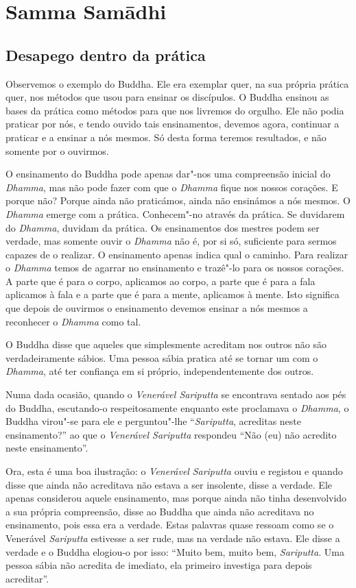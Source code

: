 \chapter{Samma Samādhi}

\section{Desapego dentro da prática}

Observemos o exemplo do Buddha. Ele era exemplar quer, na sua própria
prática quer, nos métodos que usou para ensinar os discípulos. O Buddha
ensinou as bases da prática como métodos para que nos livremos do
orgulho. Ele não podia praticar por nós, e tendo ouvido tais
ensinamentos, devemos agora, continuar a praticar e a ensinar a nós
mesmos. Só desta forma teremos resultados, e não somente por o ouvirmos.

O ensinamento do Buddha pode apenas dar"-nos uma compreensão inicial do
\emph{Dhamma}, mas não pode fazer com que o \emph{Dhamma} fique nos
nossos corações. E porque não? Porque ainda não praticámos, ainda não
ensinámos a nós mesmos. O \emph{Dhamma} emerge com a prática.
Conhecem"-no através da prática. Se duvidarem do \emph{Dhamma}, duvidam
da prática. Os ensinamentos dos mestres podem ser verdade, mas somente
ouvir o \emph{Dhamma} não é, por si só, suficiente para sermos capazes
de o realizar. O ensinamento apenas indica qual o caminho. Para realizar
o \emph{Dhamma} temos de agarrar no ensinamento e trazê"-lo para os
nossos corações. A parte que é para o corpo, aplicamos ao corpo, a parte
que é para a fala aplicamos à fala e a parte que é para a mente,
aplicamos à mente. Isto significa que depois de ouvirmos o ensinamento
devemos ensinar a nós mesmos a reconhecer o \emph{Dhamma} como
tal.

O Buddha disse que aqueles que simplesmente acreditam nos outros não são
verdadeiramente sábios. Uma pessoa sábia pratica até se tornar um com o
\emph{Dhamma}, até ter confiança em si próprio, independentemente dos
outros.

Numa dada ocasião, quando o \emph{Venerável Sariputta} se encontrava sentado aos
pés do Buddha, escutando-o respeitosamente enquanto este proclamava o
\emph{Dhamma}, o Buddha virou"-se para ele e perguntou"-lhe ``\emph{Sariputta},
acreditas neste ensinamento?'' ao que o \emph{Venerável Sariputta} respondeu
``Não (eu) não acredito neste ensinamento''.

Ora, esta é uma boa ilustração: o \emph{Venerável} \emph{Sariputta}
ouviu e registou e quando disse que ainda não acreditava não estava a
ser insolente, disse a verdade. Ele apenas considerou aquele
ensinamento, mas porque ainda não tinha desenvolvido a sua própria
compreensão, disse ao Buddha que ainda não acreditava no ensinamento,
pois essa era a verdade. Estas palavras quase ressoam como se o
Venerável \emph{Sariputta} estivesse a ser rude, mas na verdade não
estava. Ele disse a verdade e o Buddha elogiou-o por isso: ``Muito bem,
muito bem, \emph{Sariputta}. Uma pessoa sábia não acredita de imediato,
ela primeiro investiga para depois acreditar''.

